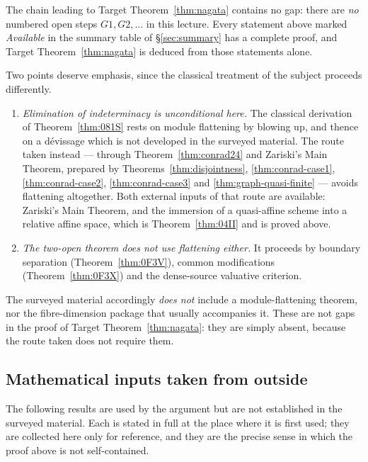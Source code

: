 \documentclass[11pt,a4paper]{article}
\theoremstyle{plain}
\theoremstyle{definition}
\theoremstyle{remark}
\begin{document}
The chain leading to Target Theorem~\ref{thm:nagata} contains no gap: there are
\emph{no} numbered open steps $G1,G2,\dots$ in this lecture. Every statement
above marked \emph{Available} in the summary table of \S\ref{sec:summary} has a
complete proof, and Target Theorem~\ref{thm:nagata} is deduced from those
statements alone.

Two points deserve emphasis, since the classical treatment of the subject
proceeds differently.

\begin{enumerate}[label=\textup{(\arabic*)}, itemsep=3pt]
\item \emph{Elimination of indeterminacy is unconditional here.} The classical
      derivation of Theorem~\ref{thm:081S} rests on module flattening by
      blowing up, and thence on a dévissage which is not developed in the
      surveyed material. The route taken instead --- through
      Theorem~\ref{thm:conrad24} and Zariski's Main Theorem, prepared by
      Theorems~\ref{thm:disjointness}, \ref{thm:conrad-case1},
      \ref{thm:conrad-case2}, \ref{thm:conrad-case3} and
      \ref{thm:graph-quasi-finite} --- avoids flattening altogether. Both
      external inputs of that route are available: Zariski's Main Theorem, and
      the immersion of a quasi-affine scheme into a relative affine space, which
      is Theorem~\ref{thm:04II} and is proved above.
\item \emph{The two-open theorem does not use flattening either.} It proceeds by
      boundary separation (Theorem~\ref{thm:0F3V}), common modifications
      (Theorem~\ref{thm:0F3X}) and the dense-source valuative criterion.
\end{enumerate}

The surveyed material accordingly \emph{does not} include a module-flattening
theorem, nor the fibre-dimension package that usually accompanies it. These are
not gaps in the proof of Target Theorem~\ref{thm:nagata}: they are simply
absent, because the route taken does not require them.

\subsection{Mathematical inputs taken from outside}

The following results are used by the argument but are not established in the
surveyed material. Each is stated in full at the place where it is first used;
they are collected here only for reference, and they are the precise sense in
which the proof above is not self-contained.
\end{document}
